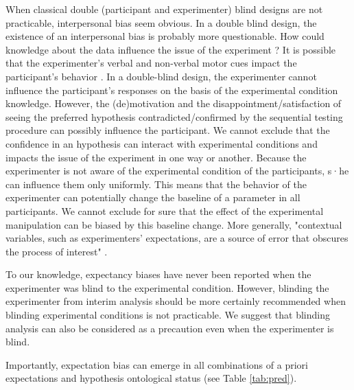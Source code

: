 \documentclass[a4paper,man,natbib,floatsintext,donotrepeattitle]{apa6}
\begin{document}
When classical double (participant and experimenter) blind designs are not practicable, interpersonal bias seem obvious. In a double blind design, the existence of an interpersonal bias is probably more questionable. How could knowledge about the data influence the issue of the experiment ? It is possible that the experimenter's verbal and non-verbal motor cues impact the participant's behavior \citep{zoble_interaction_1969}. In a double-blind design, the experimenter cannot influence the participant's responses on the basis of the experimental condition knowledge. However, the (de)motivation and the disappointment/satisfaction of seeing the preferred hypothesis contradicted/confirmed by the sequential testing procedure can possibly influence the participant. We cannot exclude that the confidence in an hypothesis can interact with experimental conditions and impacts the issue of the experiment in one way or another. Because the experimenter is not aware of the experimental condition of the participants, s·he can influence them only uniformly. This means that the behavior of the experimenter can potentially change the baseline of a parameter in all participants. We cannot exclude for sure that the effect of the experimental manipulation can be biased by this baseline change. More generally, "contextual variables, such as experimenters’ expectations, are a source of error that obscures the process of interest" \citep{klein_low_2012}.\par

To our knowledge, expectancy biases have never been reported when the experimenter was blind to the experimental condition. However, blinding the experimenter from interim analysis should be more certainly recommended \citep{lakens_performing_2014} when blinding experimental conditions is not practicable. We suggest that blinding analysis can also be considered as a precaution even when the experimenter is blind.


Importantly, expectation bias can emerge in all combinations of a priori expectations and hypothesis ontological status (see Table \ref{tab:pred}). \par

\end{document}
